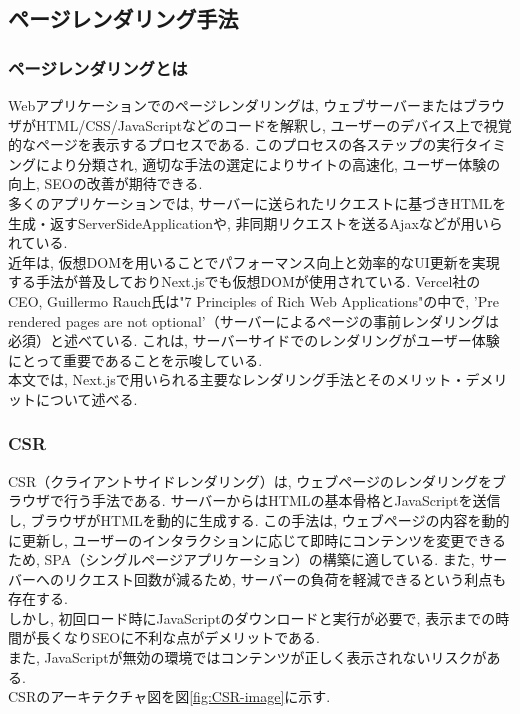 \subsection{ページレンダリング手法}
\subsubsection{ページレンダリングとは}
Webアプリケーションでのページレンダリングは, ウェブサーバーまたはブラウザがHTML/CSS/JavaScriptなどのコードを解釈し, ユーザーのデバイス上で視覚的なページを表示するプロセスである. 
このプロセスの各ステップの実行タイミングにより分類され, 適切な手法の選定によりサイトの高速化, ユーザー体験の向上, SEOの改善が期待できる. \\
多くのアプリケーションでは, サーバーに送られたリクエストに基づきHTMLを生成・返すServerSideApplicationや, 非同期リクエストを送るAjaxなどが用いられている. \\
近年は, 仮想DOMを用いることでパフォーマンス向上と効率的なUI更新を実現する手法が普及しておりNext.jsでも仮想DOMが使用されている. 
Vercel社のCEO, Guillermo Rauch氏は"7 Principles of Rich Web Applications"の中で, 'Pre rendered pages are not optional'（サーバーによるページの事前レンダリングは必須）と述べている. 
これは, サーバーサイドでのレンダリングがユーザー体験にとって重要であることを示唆している. \cite{no6}\\
本文では, Next.jsで用いられる主要なレンダリング手法とそのメリット・デメリットについて述べる. \cite{no7}

\subsubsection{CSR}
CSR（クライアントサイドレンダリング）は, ウェブページのレンダリングをブラウザで行う手法である. 
サーバーからはHTMLの基本骨格とJavaScriptを送信し, ブラウザがHTMLを動的に生成する. 
この手法は, ウェブページの内容を動的に更新し, ユーザーのインタラクションに応じて即時にコンテンツを変更できるため, SPA（シングルページアプリケーション）の構築に適している. 
また, サーバーへのリクエスト回数が減るため, サーバーの負荷を軽減できるという利点も存在する. \\
しかし, 初回ロード時にJavaScriptのダウンロードと実行が必要で, 表示までの時間が長くなりSEOに不利な点がデメリットである. \\
また, JavaScriptが無効の環境ではコンテンツが正しく表示されないリスクがある. \\
CSRのアーキテクチャ図を図\ref{fig:CSR-image}に示す. 

